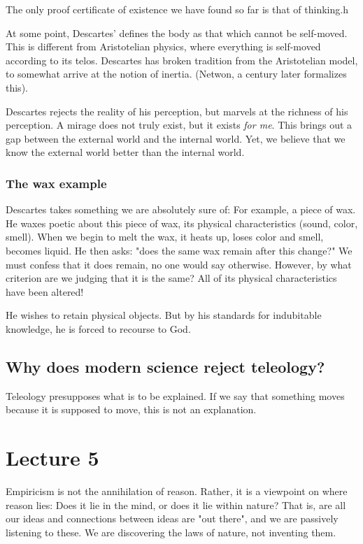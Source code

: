 \documentclass[11pt]{book}
\begin{document}
The only proof certificate of existence we have found so far is
that of thinking.h

At some point, Descartes' defines the body as that which cannot be self-moved.
This is different from Aristotelian physics, where everything is self-moved
according to its telos. Descartes has broken tradition from the Aristotelian
model, to somewhat arrive at the notion of inertia. (Netwon, a century later
formalizes this).

Descartes rejects the reality of his perception, but marvels at the richness of
his perception. A mirage does not truly exist, but it exists \textit{for me}.
This brings out a gap between the external world and the internal world.
Yet, we believe that we know the external world better than the internal world.

\subsubsection{The wax example}
Descartes takes something we are absolutely sure of: For example, a piece of
wax.  He waxes poetic about this piece of wax, its physical characteristics
(sound, color, smell). When we begin to melt the wax, it heats up, loses color
and smell, becomes liquid. He then asks: "does the same wax remain after this
change?" We must confess that it does remain, no one would say otherwise.
However, by what criterion are we judging that it is the same? All of its
physical characteristics have been altered!

He wishes to retain physical objects. But by his standards for indubitable
knowledge, he is forced to recourse to God. 

\subsection{Why does modern science reject teleology?}
Teleology presupposes what is to be explained. If we say that something moves
because it is supposed to move, this is not an explanation.

\section{Lecture 5}
Empiricism is not the annihilation of reason. Rather, it is a viewpoint on where
reason lies: Does it lie in the mind, or does it lie within nature? That is,
are all our ideas and connections between ideas are "out there", and we are
passively listening to these. We are discovering the laws of nature, not
inventing them.
\end{document}
